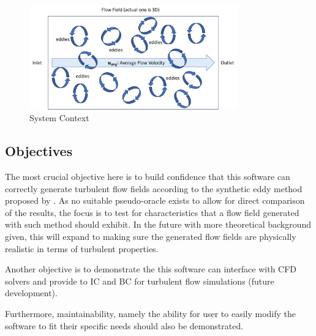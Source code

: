 \documentclass[12pt, titlepage]{article}
\begin{document}
\begin{figure}[h!]
  \begin{center}
   \includegraphics[width=0.8\textwidth]{PS.png}
  \caption{System Context}
  \label{Fig_PhysicalSystem} 
  \end{center}
\end{figure}



\subsection{Objectives}

The most crucial objective here is to build confidence that this software can correctly generate turbulent flow fields according to the synthetic eddy method proposed by \cite{PolettoEtAl2013}. As no suitable pseudo-oracle exists to allow for direct comparison of the results, the focus is to test for characteristics that a flow field generated with such method should exhibit. In the future with more theoretical background given, this will expand to making sure the generated flow fields are physically realistic in terms of turbulent properties. 

Another objective is to demonstrate the this software can interface with CFD solvers and provide to IC and BC for turbulent flow simulations (future development).

Furthermore, maintainability, namely the ability for user to easily modify the software to fit their specific needs should also be demonstrated.

\end{document}
